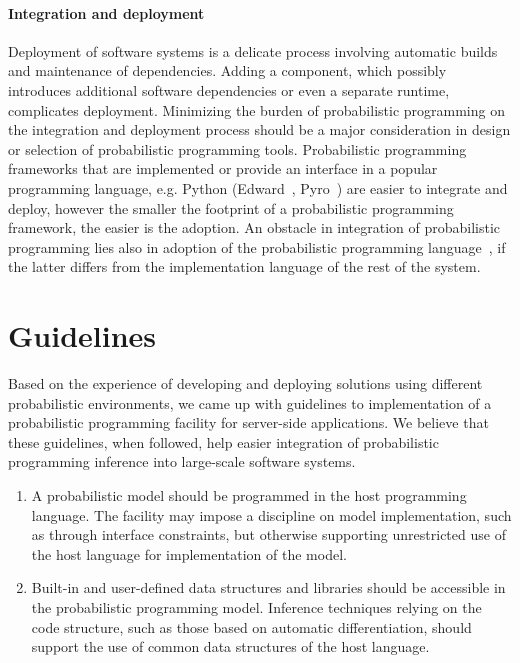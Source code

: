 \documentclass[sigplan,review,10pt,anonymous]{acmart}
\begin{document}
\begin{sloppypar}
\paragraph{Integration and deployment} Deployment of software
systems is a delicate process involving automatic builds and
maintenance of dependencies. Adding a component, which possibly
introduces additional software dependencies or even a separate
runtime, complicates deployment. Minimizing the burden of
probabilistic programming on the integration and deployment
process should be a major consideration in design or selection
of probabilistic programming tools. Probabilistic programming
frameworks that are implemented or provide an interface in a
popular programming language, e.g.  Python
(Edward~\cite{THS+17}, Pyro~\cite{BCJ+19}) are easier to
integrate and deploy, however the smaller the footprint of a
probabilistic programming framework, the easier is the adoption.
An obstacle in integration of probabilistic programming lies
also in adoption of the probabilistic programming
language~\cite{MR12}, if the latter differs from the
implementation language of the rest of the system.

\section{Guidelines}

Based on the experience of developing and deploying solutions
using different probabilistic environments, we came up with
guidelines to implementation of a probabilistic programming
facility for server-side applications. We believe that these
guidelines, when followed, help easier integration of
probabilistic programming inference into large-scale 
software systems.

\begin{enumerate}
\item A probabilistic model should be programmed in the host
programming language. The facility may impose a discipline on
model implementation, such as through interface constraints, but
otherwise supporting unrestricted use of the host language for
implementation of the model.

\item Built-in and user-defined data structures and libraries
should be accessible in the probabilistic programming model.
Inference techniques relying on the code structure, such as
those based on automatic differentiation, should support the
use of common data structures of the host language.


\end{enumerate}
\end{sloppypar}
\end{document}
